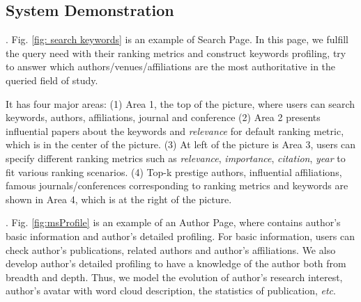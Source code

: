 \subsection{System Demonstration}
. Fig. \ref{fig: search keywords} is an example of Search Page. In this page, we fulfill the query need with their ranking metrics and construct keywords profiling, try to answer which authors/venues/affiliations are the most authoritative in the queried field of study.
\par
It has four major areas: (1) Area 1, the top of the picture, where users can search keywords, authors, affiliations, journal and conference (2) Area 2 presents influential papers about the keywords and {\em relevance} for default ranking metric, which is in the center of the picture. (3) At left of the picture is Area 3, users can specify different ranking metrics such as {\em relevance}, {\em importance}, {\em citation}, {\em year} to fit various ranking scenarios. (4) Top-k prestige authors, influential affiliations, famous journals/conferences corresponding to ranking metrics and keywords are shown in Area 4, which is at the right of the picture.


\par 
{}. Fig. \ref{fig:msProfile} is an example of an Author Page, where contains author's basic information and author's detailed profiling. For basic information, users can check author's publications, related authors and author's affiliations. We also develop author's detailed profiling to have a knowledge of the author both from breadth and depth. Thus, we model the evolution of author's research interest, author's avatar with word cloud description, the statistics of publication, {\em etc}.


